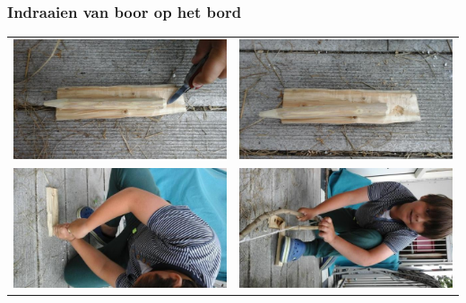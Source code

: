 \documentclass[a4paper, handout]{beamer}
\begin{document}
\begin{frame}
	\frametitle{Indraaien van boor op het bord}
	\begin{tabular}{ c c }
		\includegraphics[scale=0.16]{indraaien-1}
		&
		\includegraphics[scale=0.16]{indraaien-2}
		\\
		\includegraphics[scale=0.16]{indraaien-3}
		&
		\includegraphics[scale=0.16]{indraaien-4}

\end{tabular}
\end{frame}
\end{document}
